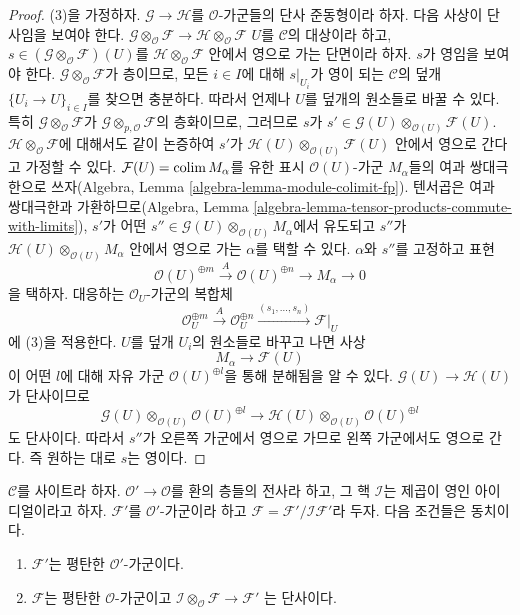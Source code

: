 \begin{proof}
\medskip\noindent
(3)을 가정하자. $\mathcal{G} \to \mathcal{H}$를 $\mathcal{O}$-가군들의
단사 준동형이라 하자. 다음 사상이 단사임을 보여야 한다.
$\mathcal{G} \otimes_\mathcal{O} \mathcal{F} \to
\mathcal{H} \otimes_\mathcal{O} \mathcal{F}$
$U$를 $\mathcal{C}$의 대상이라 하고,
$s \in (\mathcal{G} \otimes_\mathcal{O} \mathcal{F})(U)$를
$\mathcal{H} \otimes_\mathcal{O} \mathcal{F}$ 안에서 영으로 가는 단면이라
하자. $s$가 영임을 보여야 한다.
$\mathcal{G} \otimes_\mathcal{O} \mathcal{F}$가 층이므로, 모든
$i \in I$에 대해 $s|_{U_i}$가 영이 되는 $\mathcal{C}$의 덮개
$\{U_i \to U\}_{i \in I}$를 찾으면 충분하다. 따라서 언제나 $U$를 덮개의
원소들로 바꿀 수 있다. 특히 $\mathcal{G} \otimes_\mathcal{O} \mathcal{F}$가
$\mathcal{G} \otimes_{p, \mathcal{O}} \mathcal{F}$의 층화이므로,
그러므로 $s$가 $s' \in 
\mathcal{G}(U) \otimes_{\mathcal{O}(U)} \mathcal{F}(U)$.
$\mathcal{H} \otimes_\mathcal{O} \mathcal{F}$에 대해서도 같이 논증하여
$s'$가 $\mathcal{H}(U) \otimes_{\mathcal{O}(U)} \mathcal{F}(U)$ 안에서
영으로 간다고 가정할 수 있다. $\mathcal{F}(U) = \mathop{\mathrm{colim}}\nolimits M_\alpha$를 유한
표시 $\mathcal{O}(U)$-가군 $M_\alpha$들의 여과 쌍대극한으로 쓰자(Algebra,
Lemma \ref{algebra-lemma-module-colimit-fp}). 텐서곱은 여과 쌍대극한과
가환하므로(Algebra, Lemma
\ref{algebra-lemma-tensor-products-commute-with-limits}), $s'$가 어떤
$s'' \in \mathcal{G}(U) \otimes_{\mathcal{O}(U)} M_\alpha$에서 유도되고
$s''$가 $\mathcal{H}(U) \otimes_{\mathcal{O}(U)} M_\alpha$ 안에서 영으로
가는 $\alpha$를 택할 수 있다. $\alpha$와 $s''$를 고정하고 표현
$$
\mathcal{O}(U)^{\oplus m} \xrightarrow{A} \mathcal{O}(U)^{\oplus n}
\to M_\alpha \to 0
$$
을 택하자. 대응하는 $\mathcal{O}_U$-가군의 복합체
$$
\mathcal{O}_U^{\oplus m} \xrightarrow{A}
\mathcal{O}_U^{\oplus n} \xrightarrow{(s_1, \ldots, s_n)}
\mathcal{F}|_U
$$
에 (3)을 적용한다. $U$를 덮개 $U_i$의 원소들로 바꾸고 나면 사상
$$
M_\alpha \to \mathcal{F}(U)
$$
이 어떤 $l$에 대해 자유 가군 $\mathcal{O}(U)^{\oplus l}$을 통해
분해됨을 알 수 있다. $\mathcal{G}(U) \to \mathcal{H}(U)$가 단사이므로
$$
\mathcal{G}(U) \otimes_{\mathcal{O}(U)} \mathcal{O}(U)^{\oplus l}
\to
\mathcal{H}(U) \otimes_{\mathcal{O}(U)} \mathcal{O}(U)^{\oplus l}
$$
도 단사이다. 따라서 $s''$가 오른쪽 가군에서 영으로 가므로 왼쪽 가군에서도
영으로 간다. 즉 원하는 대로 $s$는 영이다.
\end{proof}

\begin{lemma}
\label{lemma-flat-over-thickening}
$\mathcal{C}$를 사이트라 하자. $\mathcal{O}' \to \mathcal{O}$를 환의
층들의 전사라 하고, 그 핵 $\mathcal{I}$는 제곱이 영인 아이디얼이라고 하자.
$\mathcal{F}'$를 $\mathcal{O}'$-가군이라 하고
$\mathcal{F} = \mathcal{F}'/\mathcal{I}\mathcal{F}'$라 두자. 다음 조건들은
동치이다.
\begin{enumerate}
\item $\mathcal{F}'$는 평탄한 $\mathcal{O}'$-가군이다.
\item $\mathcal{F}$는 평탄한 $\mathcal{O}$-가군이고
$\mathcal{I} \otimes_\mathcal{O} \mathcal{F} \to \mathcal{F}'$
는 단사이다.
\end{enumerate}
\end{lemma}

